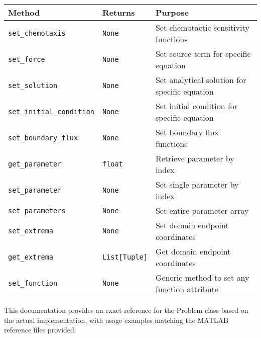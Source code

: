 \begin{longtable}{|p{}|p{3cm}|p{6cm}|}
\hline
\textbf{Method} & \textbf{Returns} & \textbf{Purpose} \\
\hline
\endhead

\texttt{set\_chemotaxis} & \texttt{None} & Set chemotactic sensitivity functions \\
\hline

\texttt{set\_force} & \texttt{None} & Set source term for specific equation \\
\hline

\texttt{set\_solution} & \texttt{None} & Set analytical solution for specific equation \\
\hline

\texttt{set\_initial\_condition} & \texttt{None} & Set initial condition for specific equation \\
\hline

\texttt{set\_boundary\_flux} & \texttt{None} & Set boundary flux functions \\
\hline

\texttt{get\_parameter} & \texttt{float} & Retrieve parameter by index \\
\hline

\texttt{set\_parameter} & \texttt{None} & Set single parameter by index \\
\hline

\texttt{set\_parameters} & \texttt{None} & Set entire parameter array \\
\hline

\texttt{set\_extrema} & \texttt{None} & Set domain endpoint coordinates \\
\hline

\texttt{get\_extrema} & \texttt{List[Tuple]} & Get domain endpoint coordinates \\
\hline

\texttt{set\_function} & \texttt{None} & Generic method to set any function attribute \\
\hline

\end{longtable}

This documentation provides an exact reference for the Problem class based on the actual implementation, with usage examples matching the MATLAB reference files provided.

